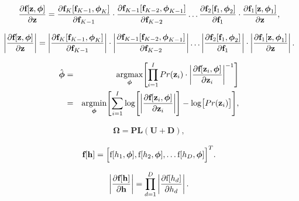 \documentclass[letterpaper,twoside,openany, titlepage,oldfontcommands,titles,dvipsnames]{memoir}
\begin{document}
\begin{eqnarray}\label{eq:flows_network_jac}
  \frac{\partial \mbox{\bf f}[\mathbf{z},\boldsymbol\phi]}{\partial \mathbf{z}} = 
  \frac{\partial \mathbf{f}_{K}[\mathbf{f}_{K-1},\boldsymbol\phi_{K}]}{\partial \mathbf{f}_{K-1}}\cdot
  \frac{\partial \mathbf{f}_{K-1}[\mathbf{f}_{K-2},\boldsymbol\phi_{K-1}]}{\partial \mathbf{f}_{K-2}}\ldots
  \frac{\partial \mathbf{f}_{2}[\mathbf{f}_{1},\boldsymbol\phi_2]}{\partial \mathbf{f}_{1}}\cdot
  \frac{\partial\mathbf{f}_{1}[\mathbf{z},\boldsymbol\phi_1]}{\partial \mathbf{z}},
 \end{eqnarray}

\begin{eqnarray}\label{eq:flows_network_det}
  \left|\frac{\partial \mbox{\bf f}[\mathbf{z},\boldsymbol\phi]}{\partial \mathbf{z}}\right|= 
  \left|\frac{\partial \mathbf{f}_{K}[\mathbf{f}_{K-1},\boldsymbol\phi_K]}{\partial \mathbf{f}_{K-1}}\right|\cdot
  \left|\frac{\partial \mathbf{f}_{K-1}[\mathbf{f}_{K-2},\boldsymbol\phi_{K-1}]}{\partial \mathbf{f}_{K-2}}\right|\ldots
  \left|\frac{\partial \mathbf{f}_{2}[\mathbf{f}_{1},\boldsymbol\phi_2]}{\partial \mathbf{f}_{1}}\right|\cdot
  \left|\frac{\partial \mathbf{f}_{1}[\mathbf{z},\boldsymbol\phi_1]}{\partial \mathbf{z}}\right|.
 \end{eqnarray}

\begin{eqnarray}
 \hat{\boldsymbol\phi} &=& \mathop{\rm argmax}_{\boldsymbol\phi}\Biggl[\prod_{i=1}^{I}Pr(\mathbf{z}_i) \cdot \biggl| \frac{\partial \mbox{\bf f}[\mathbf{z}_i,\boldsymbol\phi]}{\partial \mathbf{z}_i}\biggr|^{-1} \Biggr]\nonumber \\
 &=& \mathop{\rm argmin}_{\boldsymbol\phi}\Biggl[\sum_{i=1}^{I} \log\Biggl[\biggl| \frac{\partial \mbox{\bf f}[\mathbf{z}_i,\boldsymbol\phi]}{\partial \mathbf{z}_i}\biggr| \Biggr] -\log\bigl[Pr(\mathbf{z}_i)\bigr]\Biggr],
 \end{eqnarray}

\begin{eqnarray}
 \boldsymbol\Omega = \mathbf{P}\mathbf{L}(\mathbf{U}+\mathbf{D}),
 \end{eqnarray}

\begin{eqnarray}
 \mbox{\bf f}[\mathbf{h}] = \Bigl[\mbox{f}[h_{1},\boldsymbol\phi], \mbox{f}[h_{2},\boldsymbol\phi], \ldots \mbox{f}[h_{D},\boldsymbol\phi]\Bigr]^{T}.
 \end{eqnarray}

\begin{eqnarray}
  \left|\frac{\partial \mbox{\bf f}[\mathbf{h}]}{\partial \mathbf{h}} \right| = \prod_{d=1}^{D}\left|\frac{\partial \mbox{f}[h_d]}{\partial h_d} \right|.
 \end{eqnarray}
\end{document}
